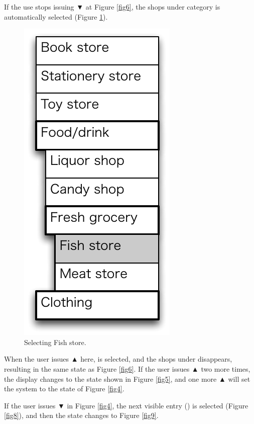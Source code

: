 \documentclass[conference]{IEEEtran}
\def\up{▲}
\def\down{▼}
\begin{document}
If the use stops issuing {\down} at Figure \ref{fig6},
the shops under category  is automatically selected (Figure \ref{fig7}).

\begin{figure}[H]
\centerline{\includegraphics[width=\menuwidth,bb=0 0 139 292]{figures/fig7.pdf}}
\caption{Selecting Fish store.}
\label{fig7}
\end{figure}

When the user issues {\up} here,  is selected,
and the shops under  disappears, 
resulting in the same state as Figure \ref{fig6}.
If the user issues {\up} two more times, the display changes to the state
shown in Figure \ref{fig5},
and one more {\up} will set the system to the state of Figure \ref{fig4}.

If the user issues {\down} in Figure \ref{fig4}, the next visible entry
() is selected (Figure \ref{fig8}), and then the state changes to Figure \ref{fig9}.
\end{document}

